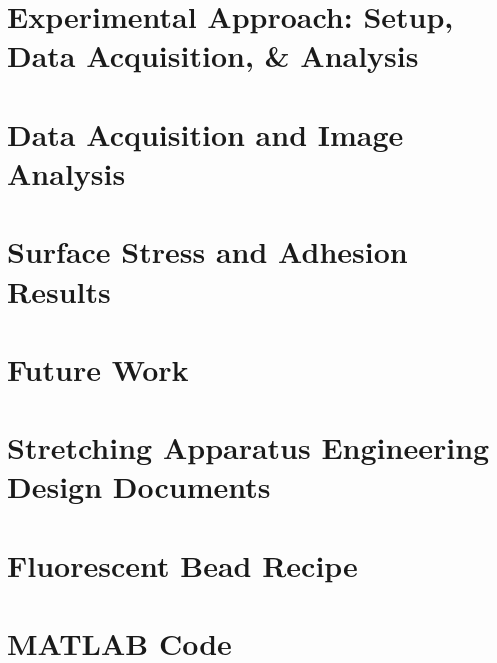 \documentclass[12pt, oneside]{book}
\newcommand\blankpage{%
	\null
	\thispagestyle{empty}%
	\addtocounter{page}{-1}%
	\newpage}
\begin{document}
\chapter{Experimental Approach: Setup, Data Acquisition, \& Analysis}

\afterpage{\blankpage}

\chapter{Data Acquisition and Image Analysis}

\afterpage{\blankpage}

\chapter{Surface Stress and Adhesion Results}

\afterpage{\blankpage}

\chapter{Future Work}


\appendix 
\chapter[Stretching Apparatus Design]{Stretching Apparatus Engineering Design Documents}

\afterpage{\blankpage}

%

\chapter{Fluorescent Bead Recipe}

\afterpage{\blankpage}

\chapter{MATLAB Code}

\afterpage{\blankpage}


%


\renewcommand{\bibname}{References}


\end{document}
